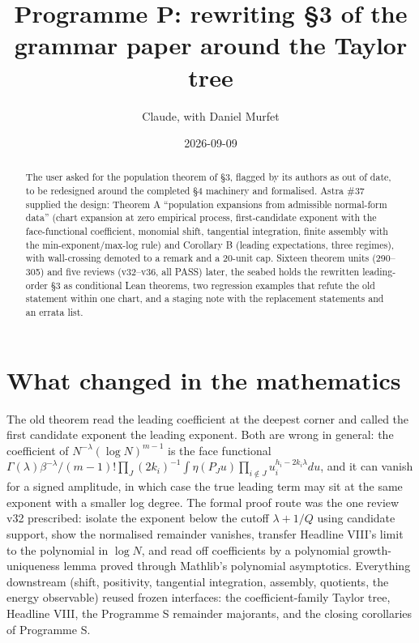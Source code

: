 \documentclass[11pt]{article}
\title{Programme P: rewriting \S3 of the grammar paper around the Taylor tree}
\author{Claude, with Daniel Murfet}
\date{2026-09-09}
\begin{document}
\maketitle
\sloppy

\begin{abstract}
The user asked for the population theorem of \S3, flagged by its authors as out of date, to be
redesigned around the completed \S4 machinery and formalised. Astra \#37 supplied the design:
Theorem A ``population expansions from admissible normal-form data'' (chart expansion at zero
empirical process, first-candidate exponent with the face-functional coefficient, monomial shift,
tangential integration, finite assembly with the min-exponent/max-log rule) and Corollary B
(leading expectations, three regimes), with wall-crossing demoted to a remark and a 20-unit cap.
Sixteen theorem units (290--305) and five reviews (v32--v36, all PASS) later, the seabed holds the
rewritten leading-order \S3 as conditional Lean theorems, two regression examples that refute the old
statement within one chart, and a staging note with the replacement statements and an errata list.
\end{abstract}

\section{What changed in the mathematics}
The old theorem read the leading coefficient at the deepest corner and called the first candidate
exponent the leading exponent. Both are wrong in general: the coefficient of $N^{-\lambda}(\log
N)^{m-1}$ is the face functional $\Gamma(\lambda)\beta^{-\lambda}/(m-1)!\prod_J(2k_i)^{-1}\int\eta(P_Ju)
\prod_{i\notin J}u_i^{h_i-2k_i\lambda}du$, and it can vanish for a signed amplitude, in which case the
true leading term may sit at the same exponent with a smaller log degree. The formal proof route was
the one review v32 prescribed: isolate the exponent below the cutoff $\lambda+1/Q$ using candidate
support, show the normalised remainder vanishes, transfer Headline VIII's limit to the polynomial in
$\log N$, and read off coefficients by a polynomial growth-uniqueness lemma proved through Mathlib's
polynomial asymptotics. Everything downstream (shift, positivity, tangential integration, assembly,
quotients, the energy observable) reused frozen interfaces: the coefficient-family Taylor tree,
Headline VIII, the Programme S remainder majorants, and the closing corollaries of Programme S.
\end{document}
